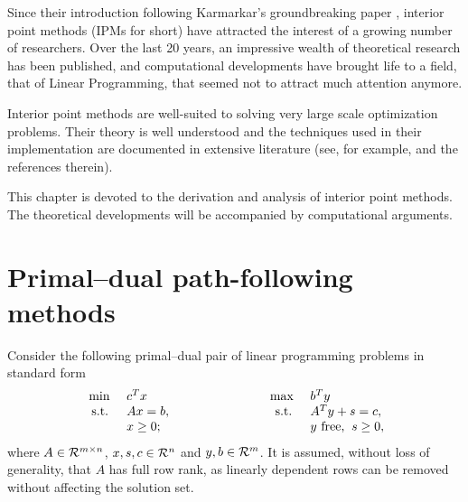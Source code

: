 
%
%
\label{ch:Introduction}

Since their introduction following Karmarkar's groundbreaking paper
\cite{Karmarkar}, interior point methods (IPMs for short) have attracted 
the interest of a growing number of researchers.
Over the last 20 years, an impressive wealth of theoretical research
has been published, and computational developments have brought life
to a field, that of Linear Programming, that seemed not to attract much
attention anymore.


Interior point methods are well-suited to solving very
large scale optimization problems. Their theory is well understood
\cite{ipm:Wright97} and the techniques used in their implementation are
documented in extensive literature (see, for example, 
\cite{AndersenGondzioMeszarosXu,GondzioTerlaky} and the references therein).


This chapter is devoted to the derivation and analysis of interior 
point methods. 
The theoretical developments will be accompanied by computational 
arguments.


%
%
\section{Primal--dual path-following methods}
\label{sec:Derivation}


Consider the following primal--dual pair of linear programming problems 
in standard form
%
\begin{eqnarray} \label{eq:PrimalDualPair}
  \begin{array}{rlp{2cm}rl}
    \mbox{ min }  & c^T x  & & \mbox{ max }  & b^T y \\
    \mbox{ s.t. } & Ax = b,& & \mbox{ s.t. } & A^T y + s = c, \\
                  & x \geq 0; &  &   & y \mbox{ free,} \;\; s \geq 0,
  \end{array}
\end{eqnarray}
%
where $A \in {\cal R}^{m \times n}$, $x, s, c \in {\cal R}^{n}$ 
and $y, b \in {\cal R}^{m}$. It is assumed, without loss of generality,
that $A$ has full row rank, as linearly dependent rows can be
removed without affecting the solution set.

